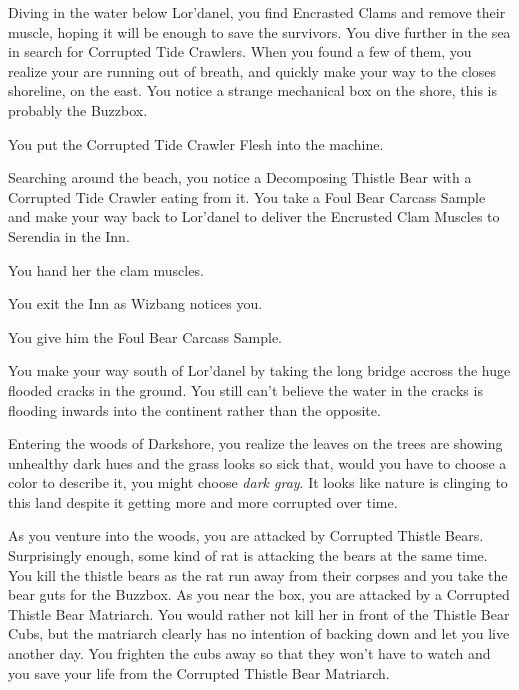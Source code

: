 Diving in the water below Lor'danel, you find Encrasted Clams and remove their muscle, hoping it will be enough to save the survivors. You dive further in the sea in search for Corrupted Tide Crawlers. When you found a few of them, you realize your are running out of breath, and quickly make your way to the closes shoreline, on the east. You notice a strange mechanical box on the shore, this is probably the Buzzbox.


You put the Corrupted Tide Crawler Flesh into the machine.



Searching around the beach, you notice a Decomposing Thistle Bear with a Corrupted Tide Crawler eating from it. You take a Foul Bear Carcass Sample and make your way back to Lor'danel to deliver the Encrusted Clam Muscles to Serendia in the Inn.


You hand her the clam muscles.


You exit the Inn as Wizbang notices you.


You give him the Foul Bear Carcass Sample.



You make your way south of Lor'danel by taking the long bridge accross the huge flooded cracks in the ground. You still can't believe the water in the cracks is flooding inwards into the continent rather than the opposite.

Entering the woods of Darkshore, you realize the leaves on the trees are showing unhealthy dark hues and the grass looks so sick that, would you have to choose a color to describe it, you might choose \emph{dark gray}. It looks like nature is clinging to this land despite it getting more and more corrupted over time.

As you venture into the woods, you are attacked by Corrupted Thistle Bears. Surprisingly enough, some kind of rat is attacking the bears at the same time. You kill the thistle bears as the rat run away from their corpses and you take the bear guts for the Buzzbox. As you near the box, you are attacked by a Corrupted Thistle Bear Matriarch. You would rather not kill her in front of the Thistle Bear Cubs, but the matriarch clearly has no intention of backing down and let you live another day. You frighten the cubs away so that they won't have to watch and you save your life from the Corrupted Thistle Bear Matriarch.

